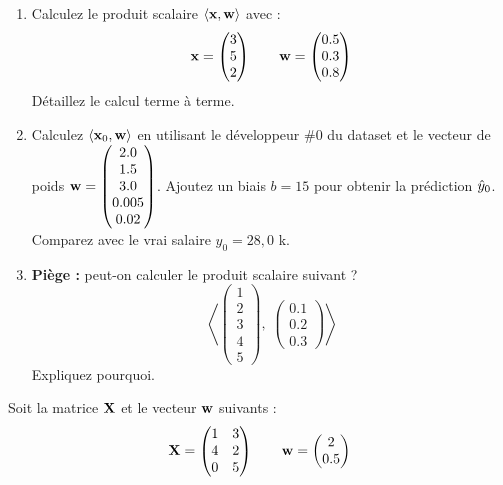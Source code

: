 \begin{enumerate}[label=\alph*)]
    \item Calculez le produit scalaire $\langle \mathbf{x}, \mathbf{w} \rangle$ avec :
    \[
        \mathbf{x} = \begin{pmatrix} 3 \\ 5 \\ 2 \end{pmatrix}
        \qquad
        \mathbf{w} = \begin{pmatrix} 0.5 \\ 0.3 \\ 0.8 \end{pmatrix}
    \]
    D\'{e}taillez le calcul terme \`{a} terme.

    \item Calculez $\langle \mathbf{x}_0, \mathbf{w} \rangle$ en utilisant le d\'{e}veloppeur \#0 du dataset
        et le vecteur de poids $\mathbf{w} = \begin{pmatrix} 2.0 \\ 1.5 \\ 3.0 \\ 0.005 \\ 0.02 \end{pmatrix}$.
        Ajoutez un biais $b = 15$ pour obtenir la pr\'{e}diction $\hat{y}_0$.
        Comparez avec le vrai salaire $y_0 = 28{,}0$ k\texteuro.

    \item \textbf{Pi\`{e}ge :} peut-on calculer le produit scalaire suivant ?
    \[
        \left\langle
        \begin{pmatrix} 1 \\ 2 \\ 3 \\ 4 \\ 5 \end{pmatrix},\;
        \begin{pmatrix} 0.1 \\ 0.2 \\ 0.3 \end{pmatrix}
        \right\rangle
    \]
    Expliquez pourquoi.
\end{enumerate}


Soit la matrice $\mathbf{X}$ et le vecteur $\mathbf{w}$ suivants :
\[
    \mathbf{X} = \begin{pmatrix}
        1 & 3 \\
        4 & 2 \\
        0 & 5
    \end{pmatrix}
    \qquad
    \mathbf{w} = \begin{pmatrix} 2 \\ 0.5 \end{pmatrix}
\]

